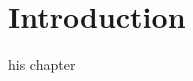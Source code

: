 \let\textcircled=\pgftextcircled
\chapter{Introduction} \label{sec:Introduction}

his chapter






\clearpage
